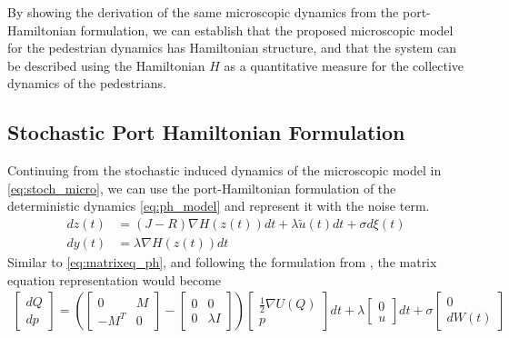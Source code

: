 By showing the derivation of the same microscopic dynamics from the port-Hamiltonian formulation, we can establish that the proposed microscopic model for the pedestrian dynamics has Hamiltonian structure, and that the system can be described using the Hamiltonian $H$ as a quantitative measure for the collective dynamics of the pedestrians.

\subsection{Stochastic Port Hamiltonian Formulation}
Continuing from the stochastic induced dynamics of the microscopic model in \autoref{eq:stoch_micro}, we can use the port-Hamiltonian formulation of the deterministic dynamics \autoref{eq:ph_model} and represent it with the noise term.
\begin{equation}
    \begin{aligned}
        dz(t) &= (J-R)\nabla H(z(t))dt + \lambda \tilde u(t)dt + \sigma d\xi(t)\\
        dy(t) &= \lambda \nabla H(z(t))dt
    \end{aligned}
    \label{eq:stoch_ph_model}
\end{equation}
Similar to \autoref{eq:matrixeq_ph}, and following the formulation from \cite{rudiger2024stability}, the matrix equation representation would become
\begin{gather}
    \begin{bmatrix}
        dQ \\ dp
    \end{bmatrix} =
    \left(
    \begin{bmatrix}
        0 & M \\ 
        -M^T & 0
    \end{bmatrix} -
    \begin{bmatrix}
        0 & 0 \\
        0 & \lambda I
    \end{bmatrix} \right)
    \begin{bmatrix}
        \frac{1}{2} \nabla U(Q) \\
        p 
    \end{bmatrix}dt
    + \lambda 
    \begin{bmatrix}
        0 \\ u
    \end{bmatrix}dt
    + \sigma
    \begin{bmatrix}
        0 \\ dW(t)
    \end{bmatrix}
    \label{eq:matrix_stoc_eq_ph}
\end{gather}

